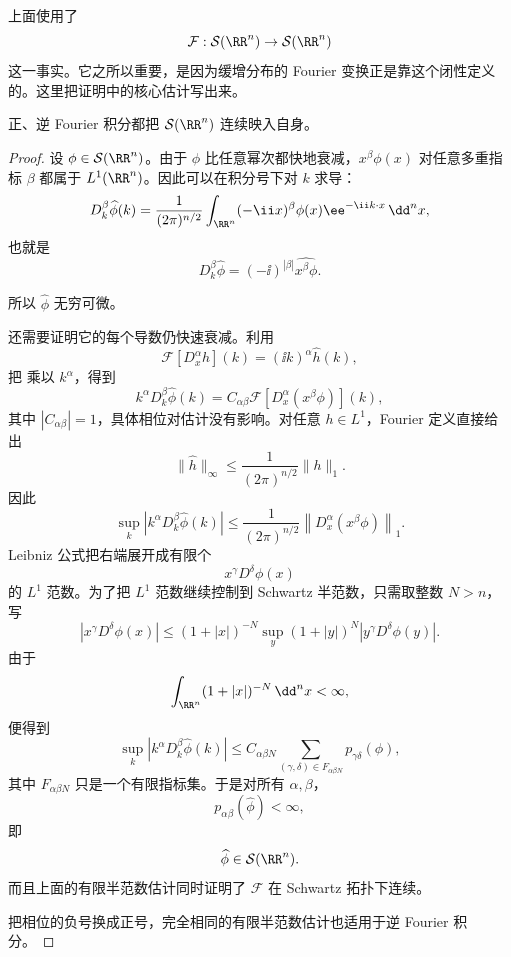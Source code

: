 上面使用了
\[
\mathcal F:\mathcal S(\RR^n)\to\mathcal S(\RR^n)
\]
这一事实。它之所以重要，是因为缓增分布的 Fourier 变换正是靠这个闭性定义的。这里把证明中的核心估计写出来。

\begin{proposition}
正、逆 Fourier 积分都把 $\mathcal S(\RR^n)$ 连续映入自身。
\end{proposition}
\begin{proof}
设 $\phi\in\mathcal S(\RR^n)$。由于 $\phi$ 比任意幂次都快地衰减，$x^\beta\phi(x)$ 对任意多重指标 $\beta$ 都属于 $L^1(\RR^n)$。因此可以在积分号下对 $k$ 求导：
\[
D_k^\beta\widehat\phi(k)
=\frac1{(2\pi)^{n/2}}
\int_{\RR^n}(-\ii x)^\beta
\phi(x)\ee^{-\ii k\cdot x}\,\dd^n x,
\]
也就是
\begin{equation}
D_k^\beta\widehat\phi
=(-\ii)^{|\beta|}\widehat{x^\beta\phi}.
\label{eq:schwartz-fourier-derivative}
\end{equation}



所以 $\widehat\phi$ 无穷可微。

还需要证明它的每个导数仍快速衰减。利用
\[
\mathcal F[D_x^\alpha h](k)
=(\ii k)^\alpha\widehat h(k),
\]
把  乘以 $k^\alpha$，得到
\begin{equation*}k^\alpha D_k^\beta\widehat\phi(k)
=C_{\alpha\beta}
\mathcal F\!\left[D_x^\alpha(x^\beta\phi)\right](k),\end{equation*}
其中 $|C_{\alpha\beta}|=1$，具体相位对估计没有影响。对任意 $h\in L^1$，Fourier 定义直接给出
\[
\|\widehat h\|_\infty
\le\frac1{(2\pi)^{n/2}}\|h\|_1.
\]
因此
\[
\sup_k
\left|k^\alpha D_k^\beta\widehat\phi(k)\right|
\le
\frac1{(2\pi)^{n/2}}
\left\|D_x^\alpha(x^\beta\phi)\right\|_1.
\]
Leibniz 公式把右端展开成有限个
\[
x^\gamma D^\delta\phi(x)
\]
的 $L^1$ 范数。为了把 $L^1$ 范数继续控制到 Schwartz 半范数，只需取整数 $N>n$，写
\[
|x^\gamma D^\delta\phi(x)|
\le
(1+|x|)^{-N}
\sup_y(1+|y|)^N|y^\gamma D^\delta\phi(y)|.
\]
由于
\[
\int_{\RR^n}(1+|x|)^{-N}\,\dd^n x<\infty,
\]
便得到
\[
\sup_k
\left|k^\alpha D_k^\beta\widehat\phi(k)\right|
\le C_{\alpha\beta N}
\sum_{(\gamma,\delta)\in F_{\alpha\beta N}}
 p_{\gamma\delta}(\phi),
\]
其中 $F_{\alpha\beta N}$ 只是一个有限指标集。于是对所有 $\alpha,\beta$，
\[
p_{\alpha\beta}(\widehat\phi)<\infty,
\]
即
\begin{equation*}{\widehat\phi\in\mathcal S(\RR^n).}\end{equation*}
而且上面的有限半范数估计同时证明了 $\mathcal F$ 在 Schwartz 拓扑下连续。

把相位的负号换成正号，完全相同的有限半范数估计也适用于逆 Fourier 积分。
\end{proof}

